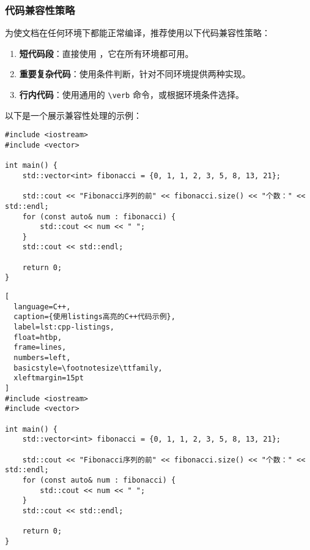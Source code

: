 \subsubsection{代码兼容性策略}

为使文档在任何环境下都能正常编译，推荐使用以下代码兼容性策略：

\begin{enumerate}
  \item \textbf{短代码段}：直接使用 ，它在所有环境都可用。
  \item \textbf{重要复杂代码}：使用条件判断，针对不同环境提供两种实现。
  \item \textbf{行内代码}：使用通用的 \verb|\verb| 命令，或根据环境条件选择。
\end{enumerate}

以下是一个展示兼容性处理的示例：

\makeatletter
\iftongjithesis@minted
\begin{listing}[!htb]
  \begin{verbatim}
#include <iostream>
#include <vector>

int main() {
    std::vector<int> fibonacci = {0, 1, 1, 2, 3, 5, 8, 13, 21};
    
    std::cout << "Fibonacci序列的前" << fibonacci.size() << "个数：" << std::endl;
    for (const auto& num : fibonacci) {
        std::cout << num << " ";
    }
    std::cout << std::endl;
    
    return 0;
}
  \end{verbatim}
  \caption{使用minted高亮的C++代码示例}\label{listing:cpp-minted}
\end{listing}
\else
\begin{lstlisting}[
  language=C++,
  caption={使用listings高亮的C++代码示例},
  label=lst:cpp-listings,
  float=htbp,
  frame=lines,
  numbers=left,
  basicstyle=\footnotesize\ttfamily,
  xleftmargin=15pt
]
#include <iostream>
#include <vector>

int main() {
    std::vector<int> fibonacci = {0, 1, 1, 2, 3, 5, 8, 13, 21};
    
    std::cout << "Fibonacci序列的前" << fibonacci.size() << "个数：" << std::endl;
    for (const auto& num : fibonacci) {
        std::cout << num << " ";
    }
    std::cout << std::endl;
    
    return 0;
}
\end{lstlisting}
\fi
\makeatother

